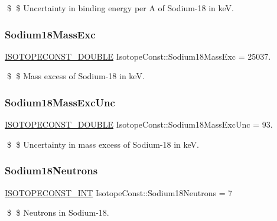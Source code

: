 \$ \$ Uncertainty in binding energy per A of Sodium-\/18 in keV. \mbox{\label{group___isotope_const-_sodium-_na18_gabda76113b84fea5dd12e393ca9ee3ea0}} 
\subsubsection{\texorpdfstring{Sodium18\+Mass\+Exc}{Sodium18MassExc}}
{\footnotesize\ttfamily \mbox{\hyperlink{group___isotope_const-_macros_ga8f45a7272ce02c0b4c65c44636ed719a}{I\+S\+O\+T\+O\+P\+E\+C\+O\+N\+S\+T\+\_\+\+D\+O\+U\+B\+LE}} Isotope\+Const\+::\+Sodium18\+Mass\+Exc = 25037.}

\$ \$ Mass excess of Sodium-\/18 in keV. \mbox{\label{group___isotope_const-_sodium-_na18_ga30668ee3cab56bcd4fce9dfb903f0321}} 
\subsubsection{\texorpdfstring{Sodium18\+Mass\+Exc\+Unc}{Sodium18MassExcUnc}}
{\footnotesize\ttfamily \mbox{\hyperlink{group___isotope_const-_macros_ga8f45a7272ce02c0b4c65c44636ed719a}{I\+S\+O\+T\+O\+P\+E\+C\+O\+N\+S\+T\+\_\+\+D\+O\+U\+B\+LE}} Isotope\+Const\+::\+Sodium18\+Mass\+Exc\+Unc = 93.}

\$ \$ Uncertainty in mass excess of Sodium-\/18 in keV. \mbox{\label{group___isotope_const-_sodium-_na18_gafb32b3f04b9bc5228e0eafd852e1b02b}} 
\subsubsection{\texorpdfstring{Sodium18\+Neutrons}{Sodium18Neutrons}}
{\footnotesize\ttfamily \mbox{\hyperlink{group___isotope_const-_macros_ga5f18360b3e99483a35c32d789e62621c}{I\+S\+O\+T\+O\+P\+E\+C\+O\+N\+S\+T\+\_\+\+I\+NT}} Isotope\+Const\+::\+Sodium18\+Neutrons = 7}

\$ \$ Neutrons in Sodium-\/18. \mbox{\label{group___isotope_const-_sodium-_na18_ga2027955b42b742d4354f99c39390720a}} 
